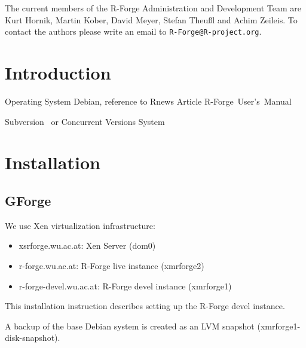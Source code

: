 \documentclass[a4paper]{article}
\newcommand{\RFORGE}{R-Forge Administration and Development Team}
\let\email=\texttt
\begin{document}
\vspace{0.5cm}
The current members of the \RFORGE{} are Kurt Hornik, Martin Kober,
David Meyer, Stefan Theu\ss{}l and Achim Zeileis. To contact the
authors please write an email to \email{R-Forge@R-project.org}.

\newpage

\pagestyle{plain}
\tableofcontents

\clearpage
\pagestyle{headings}
\setcounter{page}{1}

\section{Introduction}

Operating System Debian, reference to Rnews Article
R-Forge~User's~Manual

Subversion~\citep[SVN,
see][]{forge:Pilato+Collins-Sussman+Fitzpatrick:2004} or Concurrent
Versions System~\citep[CVS, see][]{forge:Cederqvist:2006}


\newpage
\section{Installation}
\label{sec:installation}

\subsection{GForge}

\vspace{0.5cm}
We use Xen virtualization infrastructure:

\begin{itemize}
	\item xsrforge.wu.ac.at: Xen Server (dom0)
	\item r-forge.wu.ac.at: R-Forge live instance (xmrforge2)
	\item r-forge-devel.wu.ac.at: R-Forge devel instance (xmrforge1)
\end{itemize}

This installation instruction describes setting up the R-Forge devel instance.

A backup of the base Debian system is created as an 
LVM snapshot (xmrforge1-disk-snapshot).
\end{document}
